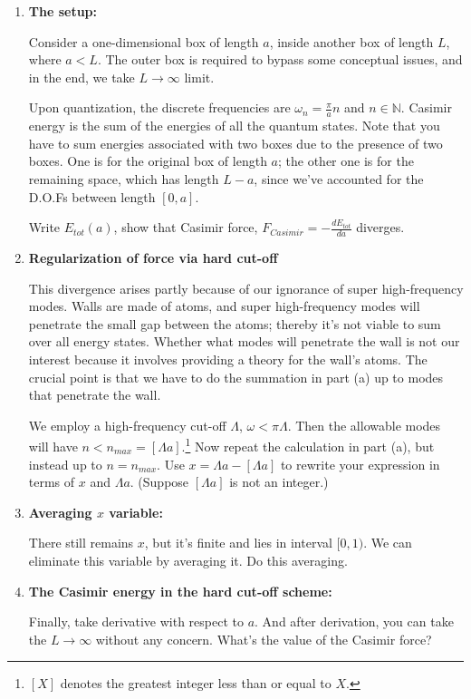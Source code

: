 \documentclass[11pt]{article}
\begin{document}
	\begin{enumerate}
		\item
		\begin{problem}{\points{-}}
			\textbf{The setup:}
			
			\noindent
			Consider a one-dimensional box of length $a$, inside another box of length $L$, where $a<L$. The outer box is required to bypass some conceptual issues, and in the end, we take $L\xrightarrow{} \infty$ limit.
			
			\noindent
			Upon quantization, the discrete frequencies are $\omega_n = \frac{\pi}{a}n$ and $n\in \mathbb{N}$. Casimir energy is the sum of the energies of all the quantum states. Note that you have to sum energies associated with two boxes due to the presence of two boxes. One is for the original box of length $a$; the other one is for the remaining space, which has length $L-a$, since we've accounted for the D.O.Fs between length $[0,a]$.
			
			\noindent
			Write $E_{tot}(a)$, show that Casimir force, $F_{Casimir} = -\frac{dE_{tot}}{da}$ diverges.
		\end{problem}
		\item
		\begin{problem}{\points{-}}
		\textbf{Regularization of force via hard cut-off}
		
	This divergence arises partly because of our ignorance of super high-frequency modes. Walls are made of atoms, and super high-frequency modes will penetrate the small gap between the atoms; thereby it's not viable to sum over all energy states. Whether what modes will penetrate the wall is not our interest because it involves providing a theory for the wall's atoms. The crucial point is that we have to do the summation in part (a) up to modes that penetrate the wall.
	
	\noindent
	We employ a high-frequency cut-off $\Lambda$, $\omega <\pi\Lambda$. Then the allowable modes will have $n< n_{max} = [\Lambda a]$.\footnote{$[X]$ denotes the greatest integer less than or equal to $X$.} Now repeat the calculation in part (a), but instead up to $n=n_{max}$. Use $x = \Lambda a - [\Lambda a]$ to rewrite your expression in terms of $x$ and $\Lambda a$. (Suppose $[\Lambda a]$ is not an integer.) 
		\end{problem}
	\item
	\begin{problem}{\points{-}}
		\textbf{Averaging $x$ variable:}
		
		\noindent
		There still remains $x$, but it's finite and lies in interval $[0,1)$. We can eliminate this variable by averaging it. Do this averaging.
	\end{problem}

	\item
\begin{problem}{\points{-}}
	\textbf{The Casimir energy in the hard cut-off scheme:}
	
	\noindent
	Finally, take derivative with respect to $a$. And after derivation, you can take the $L\xrightarrow{} \infty$ without any concern.  What's the value of the Casimir force?
\end{problem}
\end{enumerate}
\end{document}
